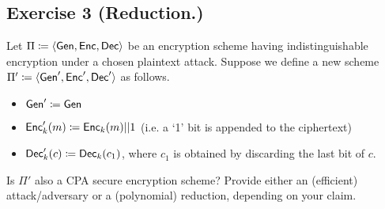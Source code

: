 \subsection{Exercise 3 (Reduction.)}

Let $\Pi \coloneqq \langle \operatorname{\mathsf{Gen}},\operatorname{\mathsf{Enc}},\operatorname{\mathsf{Dec}}\rangle$ be an encryption scheme having
indistinguishable encryption under a chosen plaintext attack. Suppose we
define a new scheme $\Pi' \coloneqq \langle \operatorname{\mathsf{Gen}}',\operatorname{\mathsf{Enc}}',\operatorname{\mathsf{Dec}}'\rangle$ as follows.
\smallskip
\begin{itemize}
  \item $\operatorname{\mathsf{Gen}}' \coloneqq \operatorname{\mathsf{Gen}}$
  \item $\operatorname{\mathsf{Enc}}_k'(m) \coloneqq \operatorname{\mathsf{Enc}}_k(m)||1$ (i.e. a `1' bit is appended to the ciphertext)
  \item $\operatorname{\mathsf{Dec}}_k'(c) \coloneqq \operatorname{\mathsf{Dec}}_k(c_1)$, where $c_1$ is obtained by discarding the last bit of $c$.
\end{itemize}
\smallskip
Is $\Pi'$ also a CPA secure encryption scheme? Provide either an (efficient) attack/adversary
or a (polynomial) reduction, depending on your claim.


